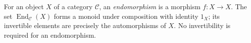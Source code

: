 
For an object $X$ of a category $\mathcal C$, an \emph{endomorphism} is a morphism $f:X\to X$. The set $\operatorname{End}_{\mathcal C}(X)$ forms a monoid under composition with identity $1_X$; its invertible elements are precisely the automorphisms of $X$. No invertibility is required for an endomorphism.
